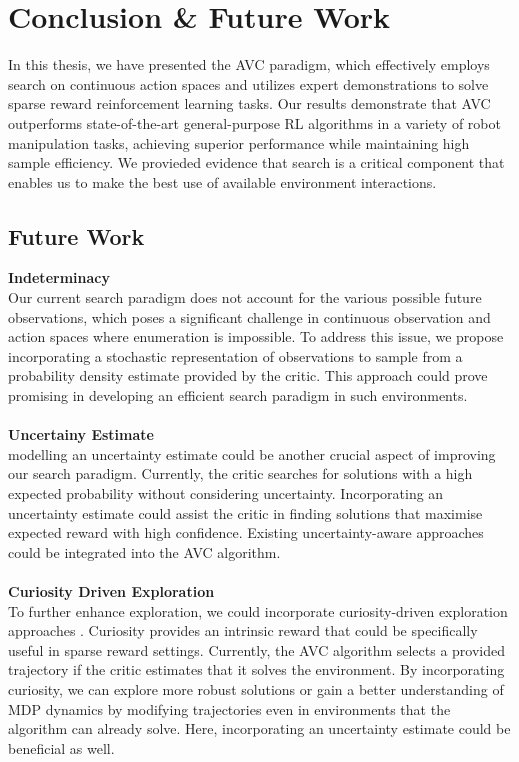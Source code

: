 
\chapter{Conclusion & Future Work}
\label{chapter:Conc_Fut}
In this thesis, we have presented the AVC paradigm, which effectively employs search on continuous action spaces and utilizes 
expert demonstrations to solve sparse reward reinforcement learning tasks. Our results demonstrate that AVC 
outperforms state-of-the-art general-purpose RL algorithms in a variety of robot manipulation tasks, achieving superior performance 
while maintaining high sample efficiency. We provieded evidence that search is a critical component that enables us to make the best use of available 
environment interactions.

\section{Future Work}
\textbf{Indeterminacy}\\
Our current search paradigm does not account for the various possible future observations, which poses a significant challenge in 
continuous observation and action spaces where enumeration is impossible. To address this issue, we propose incorporating a stochastic 
representation of observations to sample from a probability density estimate provided by the critic. 
This approach could prove promising in developing an efficient search paradigm in such environments. \\ \\

\textbf{Uncertainy Estimate}\\
modelling an uncertainty estimate could be another crucial aspect of improving our search paradigm. 
Currently, the critic searches for solutions with a high expected probability without considering uncertainty. 
Incorporating an uncertainty estimate could assist the critic in finding solutions that maximise expected reward with high confidence. 
Existing uncertainty-aware approaches \cite{gawlikowski2022survey,liu2022simple} 
could be integrated into the AVC algorithm.\\ \\

\textbf{Curiosity Driven Exploration}\\
To further enhance exploration, we could incorporate curiosity-driven exploration approaches \cite{pathak2017curiositydriven}. 
Curiosity provides an intrinsic reward that could be specifically useful in sparse reward settings. 
Currently, the AVC algorithm selects a provided trajectory if the critic estimates that it solves the environment. By incorporating curiosity, 
we can explore more robust solutions or gain a better understanding of MDP dynamics by modifying trajectories even in environments that the 
algorithm can already solve. Here, incorporating an uncertainty estimate could be beneficial as well.